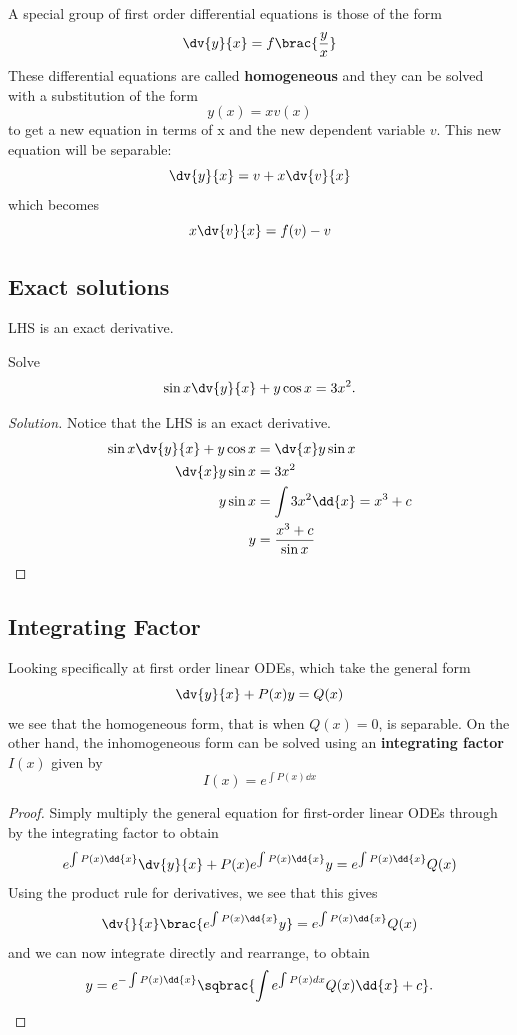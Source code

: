 A special group of first order differential equations is those of the form
\[ \dv{y}{x} = f\brac{\frac{y}{x}} \]
These differential equations are called \textbf{homogeneous} and they can be solved with a substitution
of the form
\[ y(x) = xv(x) \]
to get a new equation in terms of x and the new dependent variable $v$. This new equation will be
separable:
\[ \dv{y}{x} = v + x\dv{v}{x} \]
which becomes
\[ x\dv{v}{x} = f(v) - v \]

\subsection{Exact solutions}
LHS is an exact derivative.
\begin{exercise}{}{}
Solve 
\[ \sin x\dv{y}{x}+y\cos x=3x^2. \]
\end{exercise}
\begin{proof}[Solution]
Notice that the LHS is an exact derivative.
\begin{align*}
\sin x\dv{y}{x}+y\cos x &= \dv{x}y\sin x \\
\dv{x}y\sin x &= 3x^2 \\
y \sin x &= \int 3x^2\dd{x} = x^3+c \\
y &= \frac{x^3+c}{\sin x}
\end{align*}
\end{proof}

\subsection{Integrating Factor}
Looking specifically at first order linear ODEs, which take the general form
\[ \dv{y}{x} + P(x)y = Q(x) \]
we see that the homogeneous form, that is when $Q(x)=0$, is separable. On the other hand, the inhomogeneous form can be solved using an \textbf{integrating factor} $I(x)$ given by
\[ I(x) = e^{\int P(x) \dd{x}} \]
\begin{proof}
Simply multiply the general equation for first-order linear ODEs through by the integrating factor to obtain
\[ e^{\int P(x) \dd{x}} \dv{y}{x} + P(x) e^{\int P(x) \dd{x}}y = e^{\int P(x) \dd{x}} Q(x) \]
Using the product rule for derivatives, we see that this gives
\[ \dv{}{x}\brac{e^{\int P(x) \dd{x}}y} = e^{\int P(x) \dd{x}} Q(x) \]
and we can now integrate directly and rearrange, to obtain
\[ y = e^{-\int P(x) \dd{x}} \sqbrac{\int e^{\int P(x)dx} Q(x) \dd{x} + c}. \]
\end{proof}

